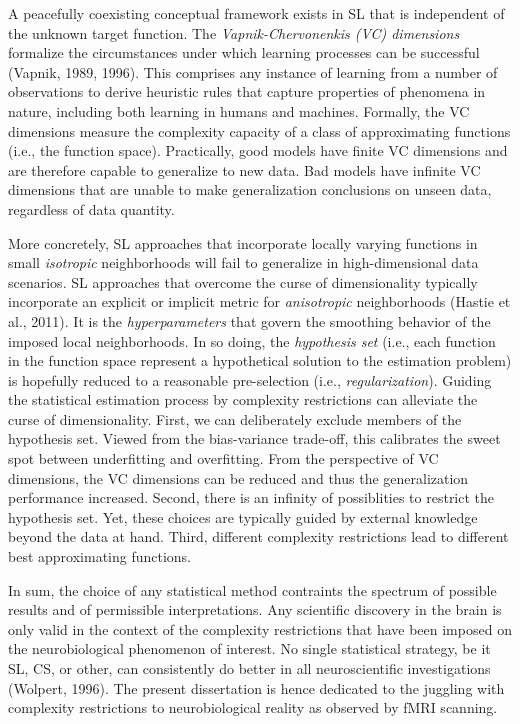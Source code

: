 \documentclass[authoryear,review,3p]{elsarticle}
\begin{document}
A peacefully coexisting conceptual framework exists in SL
that is independent
of the unknown target function.
The \textit{Vapnik-Chervonenkis (VC) dimensions}
formalize the circumstances
under which learning processes can be successful (Vapnik, 1989, 1996).
This comprises any instance of learning
from a number of observations
to derive heuristic rules that capture properties of phenomena in nature,
including both learning in humans and machines.
Formally, the VC dimensions measure the
complexity capacity of a class of approximating functions
(i.e., the function space). 
%
Practically, good models have finite VC dimensions
and are therefore capable to generalize to new data.
Bad models have infinite VC dimensions that
are unable to make generalization conclusions on unseen data,
regardless of data quantity.



More concretely,
SL approaches that incorporate locally varying functions
in small \textit{isotropic} neighborhoods
will fail to generalize in high-dimensional data scenarios.
SL approaches that overcome the curse of dimensionality typically
incorporate an explicit or implicit metric for
\textit{anisotropic} neighborhoods
(Hastie et al., 2011).
%
It is the \textit{hyperparameters} that govern the
smoothing behavior of the imposed local neighborhoods.
%
In so doing,
the \textit{hypothesis set} (i.e., each function in the function space
represent a hypothetical solution to
the estimation problem) is hopefully reduced to
a reasonable pre-selection (i.e., \textit{regularization}).
%
Guiding the statistical estimation process by
complexity restrictions can alleviate the curse of dimensionality.
First,
we can deliberately exclude members of the hypothesis set.
Viewed from the bias-variance trade-off, this calibrates
the sweet spot between underfitting and overfitting.
From the perspective of VC dimensions,
the VC dimensions can be reduced and thus the generalization performance
increased.
%
Second, there is an infinity of possiblities to restrict the hypothesis set.
Yet, these choices are typically guided by external knowledge beyond
the data at hand.
%
Third,
different complexity restrictions lead to different
best approximating functions.


In sum,
the choice of any statistical method contraints
the spectrum of possible results and of permissible interpretations.
Any scientific discovery in the brain is only valid in the
context of the complexity restrictions that have been imposed
on the neurobiological phenomenon of interest.
%
No single statistical strategy, be it SL, CS, or other,
can consistently
do better in all neuroscientific investigations
(Wolpert, 1996).
%
The present dissertation
is hence dedicated to the juggling with
complexity restrictions to
neurobiological reality as observed by fMRI scanning.
\end{document}
